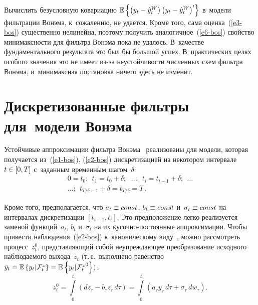 \begin{multicols}{2}
     Вычислить безусловную ковариацию 
     $\mathbb{E}\left\{ \left( y_t\hm- \hat{y}_t^W\right) \left( y_t\hm- \hat{y}_t^W\right)^\prime\right\}$ 
     в~модели фильт\-ра\-ции Вонэма, к~сожалению, не удается. Кроме того, сама оценка~(\ref{e3-bos}) 
существенно нелинейна, поэтому получить аналогичное~(\ref{e6-bos}) свойство 
минимаксности для фильт\-ра Вонэма пока не удалось. В~качестве 
фундаментального результата это был бы большой успех. В~практических 
целях особого значения это не имеет из-за не\-устой\-чи\-вости чис\-лен\-ных схем 
фильт\-ра Вонэма, и~минимаксная по\-ста\-нов\-ка ничего здесь не изменит.
     
\section{Дискретизованные фильтры для~модели Вонэма} 

      Устойчивые аппроксимации фильтра Вонэма~\cite{17-bos, 18-bos} 
реализованы для модели, которая получается из~(\ref{e1-bos}), (\ref{e2-bos}) дискретизацией на 
некотором интервале $t\hm\in [0,T]$ с~заданным временн$\acute{\mbox{ы}}$м шагом~$\delta$:
     \begin{multline*}
      0=t_0;\ \ t_1= t_0+\delta;\ \ \ldots ;\  \ t_i= t_{i-1}+\delta;\ \ \ldots\\
      \ldots  ;\ \  t_{T/\delta-1} 
+\delta= t_{T/\delta}=T\,.
    \end{multline*}
      
      Кроме того, предполагается, что $a_t\hm\equiv const$, $b_t\hm\equiv const$ 
и~$\sigma_t\hm\equiv const$ на интервалах дискретизации $[t_{i-1}, t_i]$. 
Это предположение лег\-ко реализуется заменой функций~$a_t$, $b_t$ 
и~$\sigma_t$ на их ку\-соч\-но-по\-сто\-ян\-ные аппроксимации. Чтобы 
привести наблюдения~(\ref{e2-bos}) к~каноническому виду~\cite{16-bos}, мож\-но 
рас\-смот\-реть процесс~$z_t^0$, пред\-став\-ля\-ющий собой не\-упреж\-да\-ющее 
преобразование исходного наблюдаемого выхода~$z_t$ (т.\,е.\ выполнено 
равенство $\hat{y}_t\hm= \mathbb{E}\left\{ y_t\vert \mathcal{F}_t^z\right\} \hm= 
\mathbb{E}\left\{ {y_t\vert \mathcal{F}_t^z}^0\right\})$:
      \begin{equation}
      z_t^0 = \!\int\limits_0^t \!\left( dz_\tau -b_\tau z_\tau \,d\tau \right) = \!
      \int\limits_0^t \!\left( a_\tau y_\tau \,d\tau +\sigma_\tau \,dw_\tau\right).\!
      \label{e7-bos}
      \end{equation}
      

\end{multicols}
